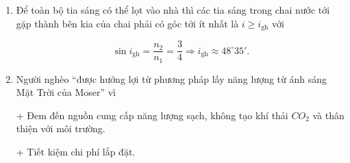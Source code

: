 \begin{enumerate}[label=\bfseries Câu \arabic*:]
{\begin{enumerate}[label=\alph*)]
			\item Để toàn bộ tia sáng có thể lọt vào nhà thì các tia sáng trong chai nước tới gặp thành bên kia của chai phải có góc tới ít nhất là $i \geq i_\text{gh}$ với
			
			
			$$\sin i_\text{gh} = \dfrac{n_2}{n_1} = \dfrac{3}{4} \Rightarrow i_\text{gh} \approx \text{48}^\circ 35'.$$
			
			\item Người nghèo “được hưởng lợi từ phương pháp lấy năng lượng từ ánh sáng Mặt Trời của Moser” vì
			
			+ Đem đến nguồn cung cấp năng lượng sạch, không tạo khí thải $CO_2$ và thân thiện với môi trường.
			
			+ Tiết kiệm chi phí lắp đặt.
			
			
		\end{enumerate}
		
	}
\end{enumerate}	
\whiteBGstarEnd